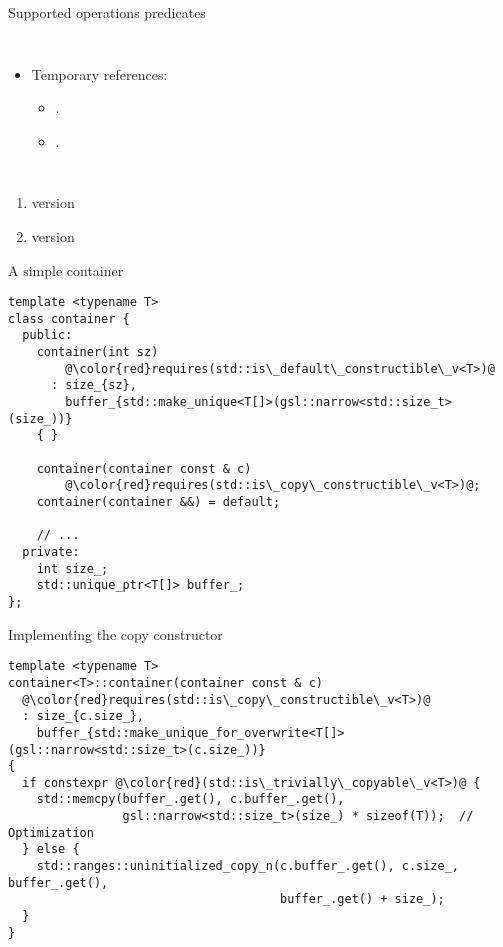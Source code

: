 \begin{frame}[t,fragile,shrink=10]{Supported operations predicates}
\begin{columns}[T]
\begin{itemize}
  \item Temporary references:
    \begin{itemize}
      \item {}.
      \item {}.
    \end{itemize}
\end{itemize}
\end{columns}

\begin{enumerate}
\item { version}
\item { version}
\end{enumerate}
\end{frame}

\begin{frame}[t,fragile]
\begin{block}{A simple container}
\begin{lstlisting}[escapechar=@]
template <typename T>
class container {
  public:
    container(int sz)
        @\color{red}requires(std::is\_default\_constructible\_v<T>)@
      : size_{sz}, 
        buffer_{std::make_unique<T[]>(gsl::narrow<std::size_t>(size_))} 
    { }  

    container(container const & c)
        @\color{red}requires(std::is\_copy\_constructible\_v<T>)@;
    container(container &&) = default;

    // ...
  private:
    int size_;
    std::unique_ptr<T[]> buffer_;
};
\end{lstlisting}
\end{block}
\end{frame}

\begin{frame}[t,fragile]
\begin{block}{Implementing the copy constructor}
\begin{lstlisting}[escapechar=@]
template <typename T>
container<T>::container(container const & c)
  @\color{red}requires(std::is\_copy\_constructible\_v<T>)@
  : size_{c.size_},                                                                    
    buffer_{std::make_unique_for_overwrite<T[]>(gsl::narrow<std::size_t>(c.size_))} 
{  
  if constexpr @\color{red}(std::is\_trivially\_copyable\_v<T>)@ {
    std::memcpy(buffer_.get(), c.buffer_.get(),
                gsl::narrow<std::size_t>(size_) * sizeof(T));  // Optimization
  } else {
    std::ranges::uninitialized_copy_n(c.buffer_.get(), c.size_, buffer_.get(),
                                      buffer_.get() + size_);
  }
}
\end{lstlisting}
\end{block}
\end{frame}

